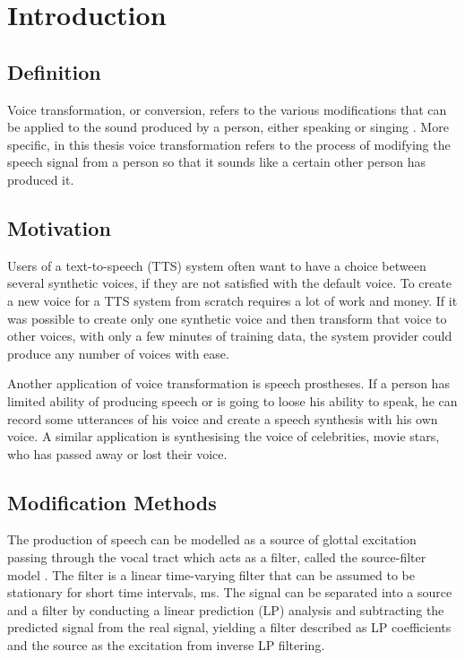 \chapter{Introduction} %
\label{cha:introduction}

\section{Definition} %
\label{sec:definition}
Voice transformation, or conversion, refers to the various modifications that can be applied to the sound produced by a person, either speaking or singing \cite{stylianou08}. More specific, in this thesis voice transformation refers to the process of modifying the speech signal from a person so that it sounds like a certain other person has produced it. 

\section{Motivation} %
\label{sec:motivation}
Users of a text-to-speech (TTS) system often want to have a choice between several synthetic voices, if they are not satisfied with the default voice. To create a new voice for a TTS system from scratch requires a lot of work and money. If it was possible to create only one synthetic voice and then transform that voice to other voices, with only a few minutes of training data, the system provider could produce any number of voices with ease. 

Another application of voice transformation is speech prostheses. If a person has limited ability of producing speech or is going to loose his ability to speak, he can record some utterances of his voice and create a speech synthesis with his own voice. A similar application is synthesising the voice of celebrities, \eg movie stars, who has passed away or lost their voice.

\section{Modification Methods} %
\label{sec:synthesis_methods}
The production of speech can be modelled as a source of glottal excitation passing through the vocal tract which acts as a filter, called the source-filter model \cite{taletek}. The filter is a linear time-varying filter that can be assumed to be stationary for short time intervals,  ms. The signal can be separated into a source and a filter by conducting a linear prediction (LP) analysis and subtracting the predicted signal from the real signal, yielding a filter described as LP coefficients and the source as the excitation from inverse LP filtering.

